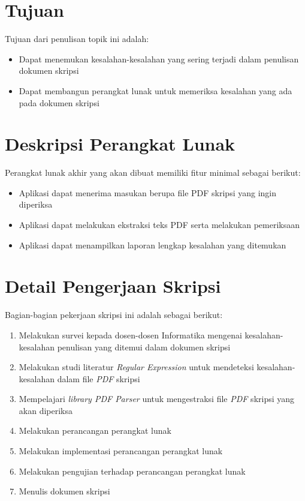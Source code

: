 \documentclass[a4paper,twoside]{article}
\begin{document}
\section{Tujuan}
Tujuan dari penulisan topik ini adalah:
\begin{itemize}
	\item Dapat menemukan kesalahan-kesalahan yang sering terjadi dalam penulisan dokumen skripsi
	\item Dapat membangun perangkat lunak untuk memeriksa kesalahan yang ada pada dokumen skripsi
\end{itemize}

\section{Deskripsi Perangkat Lunak}
Perangkat lunak akhir yang akan dibuat memiliki fitur minimal sebagai berikut:
\begin{itemize}
	\item Aplikasi dapat menerima masukan berupa file PDF skripsi yang ingin diperiksa
	\item Aplikasi dapat melakukan ekstraksi teks PDF serta melakukan pemeriksaan
	\item Aplikasi dapat menampilkan laporan lengkap kesalahan yang ditemukan
\end{itemize}

\section{Detail Pengerjaan Skripsi}
Bagian-bagian pekerjaan skripsi ini adalah sebagai berikut:
\begin{enumerate}		
	\item Melakukan survei kepada dosen-dosen Informatika mengenai kesalahan-kesalahan penulisan yang ditemui dalam dokumen skripsi	
	\item Melakukan studi literatur \textit{Regular Expression} untuk mendeteksi kesalahan-kesalahan dalam file \textit{PDF} skripsi
	\item Mempelajari \textit{library PDF Parser} untuk mengestraksi file \textit{PDF} skripsi yang akan diperiksa
	\item Melakukan perancangan perangkat lunak
	\item Melakukan implementasi perancangan perangkat lunak
	\item Melakukan pengujian terhadap perancangan perangkat lunak
	\item Menulis dokumen skripsi
\end{enumerate}
\end{document}
